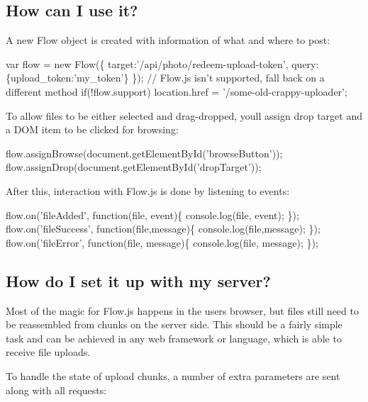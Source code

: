  \subsection*{How can I use it?}

A new {\ttfamily Flow} object is created with information of what and where to post\+: 
\begin{DoxyCode}
var flow = new Flow(\{
  target:'/api/photo/redeem-upload-token', 
  query:\{upload\_token:'my\_token'\}
\});
// Flow.js isn't supported, fall back on a different method
if(!flow.support) location.href = '/some-old-crappy-uploader';
\end{DoxyCode}
 To allow files to be either selected and drag-\/dropped, you\textquotesingle{}ll assign drop target and a D\+OM item to be clicked for browsing\+: 
\begin{DoxyCode}
flow.assignBrowse(document.getElementById('browseButton'));
flow.assignDrop(document.getElementById('dropTarget'));
\end{DoxyCode}
 After this, interaction with Flow.\+js is done by listening to events\+: 
\begin{DoxyCode}
flow.on('fileAdded', function(file, event)\{
    console.log(file, event);
\});
flow.on('fileSuccess', function(file,message)\{
    console.log(file,message);
\});
flow.on('fileError', function(file, message)\{
    console.log(file, message);
\});
\end{DoxyCode}
 \subsection*{How do I set it up with my server?}

Most of the magic for Flow.\+js happens in the user\textquotesingle{}s browser, but files still need to be reassembled from chunks on the server side. This should be a fairly simple task and can be achieved in any web framework or language, which is able to receive file uploads.

To handle the state of upload chunks, a number of extra parameters are sent along with all requests\+:


